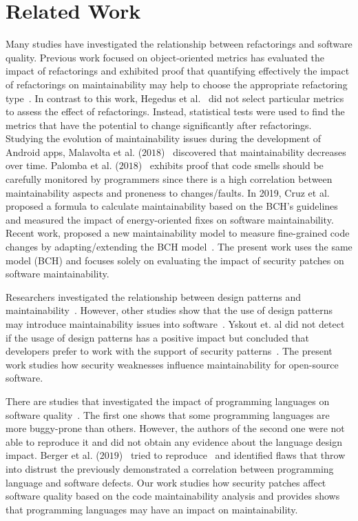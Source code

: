 \documentclass[smallextended]{svjour3}       %
\begin{document}
\section{Related Work}\label{sec:rw}

Many studies have investigated the relationship between refactorings and
software quality. Previous work focused on object-oriented metrics has evaluated the
impact of refactorings and exhibited proof that quantifying effectively the
impact of refactorings on maintainability may help to choose the appropriate
refactoring type~\cite{1167822}. In contrast to this work, Hegedus et
al.~\cite{HEGEDUS2018313} did not select particular metrics to assess the effect
of refactorings. Instead, statistical tests were used to find the metrics that
have the potential to change significantly after refactorings. Studying the evolution 
of maintainability issues during the development of Android apps, Malavolta et al. ($2018$)~\cite{8530041}
discovered that maintainability decreases over time. Palomba et al.
($2018$)~\cite{Palomba:2018:DIM:3231288.3231337} exhibits proof that code smells
should be carefully monitored by programmers since there is a high correlation
between maintainability aspects and proneness to changes/faults. In 2019, Cruz et 
al.~\cite{8919169} proposed a formula to calculate maintainability 
based on the BCH's guidelines and measured the impact of energy-oriented fixes 
on software maintainability. Recent work,
proposed a new maintainability model to 
measure fine-grained code changes by adapting/extending the BCH model~\cite{8785997}.
The present work uses the same model (BCH) and focuses 
solely on evaluating the impact of security patches on software maintainability.

Researchers investigated the relationship between design patterns and
maintainability~\cite{10.1007/978-3-642-35267-6-18}. However, other studies show that 
the use of design patterns may introduce maintainability issues into
software~\cite{4493325}. Yskout et. al did not detect if the usage of 
design patterns has a positive impact but concluded that developers prefer to 
work with the support of security patterns~\cite{8077802}. The present work 
studies how security weaknesses influence maintainability for open-source software.

There are studies that investigated the impact of programming languages on software
quality~\cite{Ray:2014:LSS:2635868.2635922,Ray:2017:LSP:3144574.3126905}. The first
one shows that some programming languages are more buggy-prone than others. However,
the authors of the second one were not able to reproduce it and did not obtain any
evidence about the language design impact. 
Berger et al. ($2019$)~\cite{2019arXiv190110220B} tried to reproduce~\cite{Ray:2014:LSS:2635868.2635922,Ray:2017:LSP:3144574.3126905} 
and identified flaws that throw into distrust the 
previously demonstrated a correlation between programming language and software 
defects. Our work studies how security patches affect software quality based 
on the code maintainability analysis and provides shows that programming languages 
may have an impact on maintainability.
\end{document}
